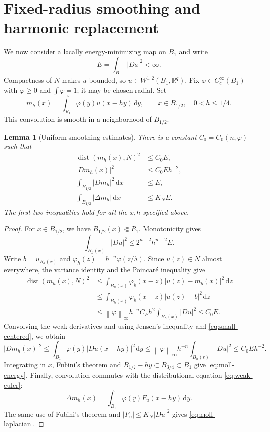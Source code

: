 \documentclass[11pt,a4paper]{article}
\numberwithin{equation}{section}
\newtheorem{lemma}[theorem]{Lemma}
\theoremstyle{definition}
\newcommand{\R}{\mathbb R}
\newcommand{\dd}{\,\mathrm d}
\newcommand{\dx}{\dd x}
\newcommand{\dy}{\dd y}
\newcommand{\dist}{\operatorname{dist}}
\newcommand{\W}{W^{1,2}}
\newcommand{\norm}[1]{\left\lVert #1\right\rVert}
\begin{document}
\section{Fixed-radius smoothing and harmonic replacement}

We now consider a locally energy-minimizing map on $B_1$ and write
\[
E=\int_{B_1}|Du|^2<\infty.
\]
Compactness of $N$ makes $u$ bounded, so $u\in\W(B_1,\R^q)$. Fix $\varphi\in C_c^\infty(B_1)$ with $\varphi\ge0$ and $\int\varphi=1$; it may be chosen radial. Set
\[
m_h(x)=\int_{B_1}\varphi(y)u(x-hy)\dy,
\qquad x\in B_{1/2},\quad0<h\le1/4.
\]
This convolution is smooth in a neighborhood of $B_{1/2}$.

\begin{lemma}[Uniform smoothing estimates]\label{lem:mollifier}
There is a constant $C_0=C_0(n,\varphi)$ such that
\begin{align}
\dist(m_h(x),N)^2&\le C_0E,\label{eq:tube-distance}\\
|Dm_h(x)|^2&\le C_0 E h^{-2},\label{eq:moll-gradient}\\
\int_{B_{1/2}}|Dm_h|^2\dx&\le E,\label{eq:moll-energy}\\
\int_{B_{1/2}}|\Delta m_h|\dx&\le K_NE.\label{eq:moll-laplacian}
\end{align}
The first two inequalities hold for all the $x,h$ specified above.
\end{lemma}
\begin{proof}
For $x\in B_{1/2}$, we have $B_{1/2}(x)\Subset B_1$. Monotonicity gives
\begin{equation}\label{eq:small-centered}
\int_{B_h(x)}|Du|^2\le2^{n-2}h^{n-2}E.
\end{equation}
Write $b=u_{B_h(x)}$ and $\varphi_h(z)=h^{-n}\varphi(z/h)$. Since $u(z)\in N$ almost everywhere, the variance identity and the Poincaré inequality give
\begin{align*}
\dist(m_h(x),N)^2
&\le\int_{B_h(x)}\varphi_h(x-z)|u(z)-m_h(x)|^2\dd z\\
&\le\int_{B_h(x)}\varphi_h(x-z)|u(z)-b|^2\dd z\\
&\le\norm{\varphi}_\infty h^{-n} C_P h^2
\int_{B_h(x)}|Du|^2
\le C_0E.
\end{align*}
Convolving the weak derivatives and using Jensen's inequality and \eqref{eq:small-centered}, we obtain
\[
|Dm_h(x)|^2\le\int_{B_1}\varphi(y)|Du(x-hy)|^2\dy
\le\norm{\varphi}_\infty h^{-n}\int_{B_h(x)}|Du|^2
\le C_0Eh^{-2}.
\]
Integrating in $x$, Fubini's theorem and $B_{1/2}-hy\subset B_{3/4}\subset B_1$ give \eqref{eq:moll-energy}. Finally, convolution commutes with the distributional equation \eqref{eq:weak-euler}:
\[
\Delta m_h(x)=\int_{B_1}\varphi(y)F_u(x-hy)\dy.
\]
The same use of Fubini's theorem and $|F_u|\le K_N|Du|^2$ gives \eqref{eq:moll-laplacian}.
\end{proof}
\end{document}
